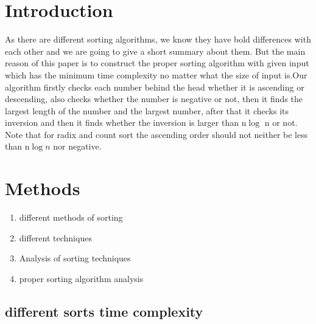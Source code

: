 \documentclass[
10pt, %
a4paper, %
oneside, %
headinclude,footinclude, %
BCOR5mm, %
]{scrartcl}
\begin{document}
\section{Introduction}

As there are different sorting algorithms, we know they have  
bold differences with each other and we are going to give a short summary about them. But the main reason of this paper is to construct the proper sorting algorithm with given input which has the minimum time complexity no matter what the size of input is.Our algorithm firstly checks each number behind the head whether it is ascending or descending, also checks whether the number is negative or not, then it finds the largest length of the number and the largest number, after that it checks its inversion and then it finds whether the inversion is larger than n$\log$ n or not. Note that for radix and count sort the ascending order should not neither be less than n$\log n$ nor negative.

\section{Methods}



\begin{enumerate}[noitemsep]
\item different methods of sorting
\item different techniques
\item Analysis of sorting techniques 
\item proper sorting algorithm analysis
\end{enumerate}


\subsection{different sorts time complexity}
\end{document}
